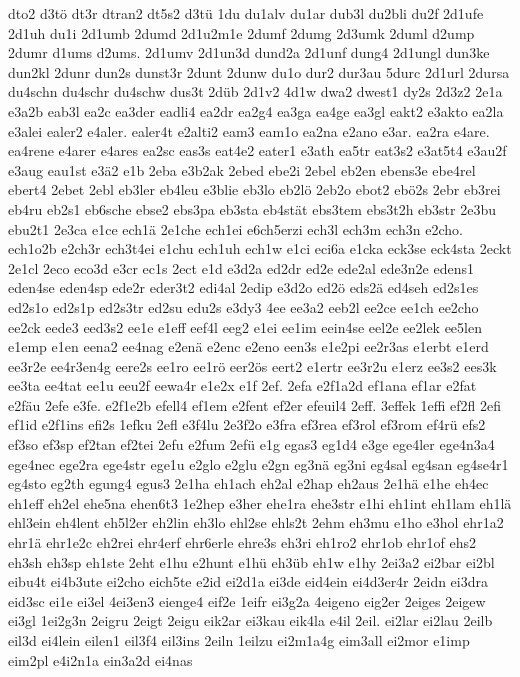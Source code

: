 {dto2
d3tö
dt3r
dtran2
dt5s2
d3tü
1du
du1alv
du1ar
dub3l
du2bli
du2f
2d1ufe
2d1uh
du1i
2d1umb
2dumd
2d1u2m1e
2dumf
2dumg
2d3umk
2duml
d2ump
2dumr
d1ums
d2ums.
2d1umv
2d1un3d
dund2a
2d1unf
dung4
2d1ungl
dun3ke
dun2kl
2dunr
dun2s
dunst3r
2dunt
2dunw
du1o
dur2
dur3au
5durc
2d1url
2dursa
du4schn
du4schr
du4schw
dus3t
2düb
2d1v2
4d1w
dwa2
dwest1
dy2s
2d3z2
2e1a
e3a2b
eab3l
ea2c
ea3der
eadli4
ea2dr
ea2g4
ea3ga
ea4ge
ea3gl
eakt2
e3akto
ea2la
e3alei
ealer2
e4aler.
ealer4t
e2alti2
eam3
eam1o
ea2na
e2ano
e3ar.
ea2ra
e4are.
ea4rene
e4arer
e4ares
ea2sc
eas3s
eat4e2
eater1
e3ath
ea5tr
eat3s2
e3at5t4
e3au2f
e3aug
eau1st
e3ä2
e1b
2eba
e3b2ak
2ebed
ebe2i
2ebel
eb2en
ebens3e
ebe4rel
ebert4
2ebet
2ebl
eb3ler
eb4leu
e3blie
eb3lo
eb2lö
2eb2o
ebot2
ebö2s
2ebr
eb3rei
eb4ru
eb2s1
eb6sche
ebse2
ebs3pa
eb3sta
eb4stät
ebs3tem
ebs3t2h
eb3str
2e3bu
ebu2t1
2e3ca
e1ce
ech1ä
2e1che
ech1ei
e6ch5erzi
ech3l
ech3m
ech3n
e2cho.
ech1o2b
e2ch3r
ech3t4ei
e1chu
ech1uh
ech1w
e1ci
eci6a
e1cka
eck3se
eck4sta
2eckt
2e1cl
2eco
eco3d
e3cr
ec1s
2ect
e1d
e3d2a
ed2dr
ed2e
ede2al
ede3n2e
edens1
eden4se
eden4sp
ede2r
eder3t2
edi4al
2edip
e3d2o
ed2ö
eds2ä
ed4seh
ed2s1es
ed2s1o
ed2s1p
ed2s3tr
ed2su
edu2s
e3dy3
4ee
ee3a2
eeb2l
ee2ce
ee1ch
ee2cho
ee2ck
eede3
eed3s2
ee1e
e1eff
eef4l
eeg2
e1ei
ee1im
eein4se
eel2e
ee2lek
ee5len
e1emp
e1en
eena2
ee4nag
e2enä
e2enc
e2eno
een3s
e1e2pi
ee2r3as
e1erbt
e1erd
ee3r2e
ee4r3en4g
eere2s
ee1ro
ee1rö
eer2ös
eert2
e1ertr
ee3r2u
e1erz
ee3s2
ees3k
ee3ta
ee4tat
ee1u
eeu2f
eewa4r
e1e2x
e1f
2ef.
2efa
e2f1a2d
ef1ana
ef1ar
e2fat
e2fäu
2efe
e3fe.
e2f1e2b
efell4
ef1em
e2fent
ef2er
efeuil4
2eff.
3effek
1effi
ef2fl
2efi
ef1id
e2f1ins
efi2s
1efku
2efl
e3f4lu
2e3f2o
e3fra
ef3rea
ef3rol
ef3rom
ef4rü
efs2
ef3so
ef3sp
ef2tan
ef2tei
2efu
e2fum
2efü
e1g
egas3
eg1d4
e3ge
ege4ler
ege4n3a4
ege4nec
ege2ra
ege4str
ege1u
e2glo
e2glu
e2gn
eg3nä
eg3ni
eg4sal
eg4san
eg4se4r1
eg4sto
eg2th
egung4
egus3
2e1ha
eh1ach
eh2al
e2hap
eh2aus
2e1hä
e1he
eh4ec
eh1eff
eh2el
ehe5na
ehen6t3
1e2hep
e3her
ehe1ra
ehe3str
e1hi
eh1int
eh1lam
eh1lä
ehl3ein
eh4lent
eh5l2er
eh2lin
eh3lo
ehl2se
ehls2t
2ehm
eh3mu
e1ho
e3hol
ehr1a2
ehr1ä
ehr1e2c
eh2rei
ehr4erf
ehr6erle
ehre3s
eh3ri
eh1ro2
ehr1ob
ehr1of
ehs2
eh3sh
eh3sp
eh1ste
2eht
e1hu
e2hunt
e1hü
eh3üb
eh1w
e1hy
2ei3a2
ei2bar
ei2bl
eibu4t
ei4b3ute
ei2cho
eich5te
e2id
ei2d1a
ei3de
eid4ein
ei4d3er4r
2eidn
ei3dra
eid3sc
ei1e
ei3el
4ei3en3
eienge4
eif2e
1eifr
ei3g2a
4eigeno
eig2er
2eiges
2eigew
ei3gl
1ei2g3n
2eigru
2eigt
2eigu
eik2ar
ei3kau
eik4la
e4il
2eil.
ei2lar
ei2lau
2eilb
eil3d
ei4lein
eilen1
eil3f4
eil3ins
2eiln
1eilzu
ei2m1a4g
eim3all
ei2mor
e1imp
eim2pl
e4i2n1a
ein3a2d
ei4nas
}
